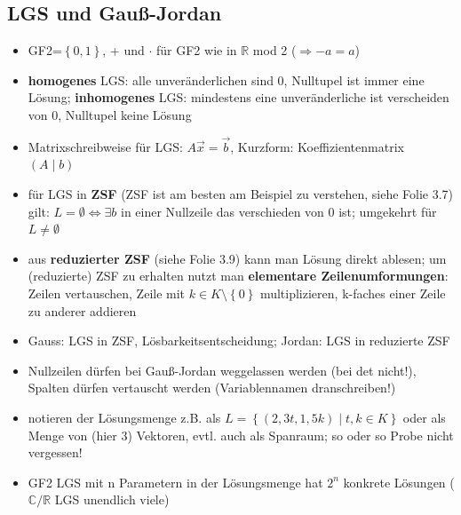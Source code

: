 \documentclass[10pt,a4paper]{article}
\begin{document}
\subsection{LGS und Gauß-Jordan}
\begin{itemize}
\item GF2=$\left\lbrace 0,1\right\rbrace$, + und $\cdot$ für GF2 wie in $\mathbb{R}$ mod 2 ($\Rightarrow -a=a$)
\item \textbf{homogenes} LGS: alle unveränderlichen sind 0, Nulltupel ist immer eine Lösung; \textbf{inhomogenes} LGS: mindestens eine unveränderliche ist verscheiden von 0, Nulltupel keine Lösung  
\item Matrixschreibweise für LGS: $A\overrightarrow{x}=\overrightarrow{b}$, Kurzform: Koeffizientenmatrix $(A \mid b)$
\item für LGS in \textbf{ZSF} (ZSF ist am besten am Beispiel zu verstehen, siehe Folie 3.7) gilt: $L=\emptyset \Leftrightarrow \exists b$ in einer Nullzeile das verschieden von 0 ist; umgekehrt für $L\neq \emptyset$
\item aus \textbf{reduzierter ZSF} (siehe Folie 3.9) kann man Lösung direkt ablesen; um (reduzierte) ZSF zu erhalten nutzt man \textbf{elementare Zeilenumformungen}: Zeilen vertauschen, Zeile mit $k\in K\setminus \left\lbrace 0\right\rbrace$ multiplizieren, k-faches einer Zeile zu anderer addieren
\item Gauss: LGS in ZSF, Lösbarkeitsentscheidung; Jordan: LGS in reduzierte ZSF
\item Nullzeilen dürfen bei Gauß-Jordan weggelassen werden (bei det nicht!), Spalten dürfen vertauscht werden (Variablennamen dranschreiben!)
\item notieren der Lösungsmenge z.B. als $L=\left\lbrace (2,3t,1,5k)\mid t,k \in K \right\rbrace$ oder als Menge von (hier 3) Vektoren, evtl. auch als Spanraum; so oder so Probe nicht vergessen!
\item GF2 LGS mit n Parametern in der Lösungsmenge hat $2^{n}$ konkrete Lösungen ($\mathbb{C}/\mathbb{R}$ LGS unendlich viele)
\end{itemize}
\end{document}
